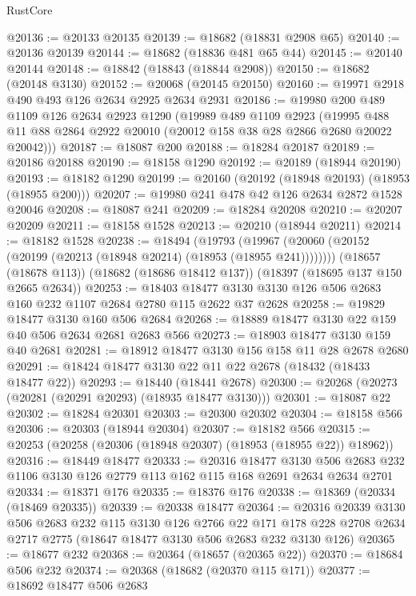 \begin{lexlean}{RustCore}
\begin{coremodule}
@20136 := @20133 @20135
@20139 := @18682 (@18831 @2908 @65)
@20140 := @20136 @20139
@20144 := @18682 (@18836 @481 @65 @44)
@20145 := @20140 @20144
@20148 := @18842 (@18843 (@18844 @2908))
@20150 := @18682 (@20148 @3130)
@20152 := @20068 (@20145 @20150)
@20160 := @19971 @2918 @490 @493 @126 @2634 @2925 @2634 @2931
@20186 := @19980
    @200
    @489
    @1109
    @126
    @2634
    @2923
    @1290
    (@19989
      @489
      @1109
      @2923
      (@19995 @488 @11 @88 @2864 @2922 @20010 (@20012 @158 @38 @28 @2866 @2680 @20022 @20042)))
@20187 := @18087 @200
@20188 := @18284 @20187
@20189 := @20186 @20188
@20190 := @18158 @1290
@20192 := @20189 (@18944 @20190)
@20193 := @18182 @1290
@20199 := @20160 (@20192 (@18948 @20193) (@18953 (@18955 @200)))
@20207 := @19980 @241 @478 @42 @126 @2634 @2872 @1528 @20046
@20208 := @18087 @241
@20209 := @18284 @20208
@20210 := @20207 @20209
@20211 := @18158 @1528
@20213 := @20210 (@18944 @20211)
@20214 := @18182 @1528
@20238 := @18494
    (@19793 (@19967 (@20060 (@20152 (@20199 (@20213 (@18948 @20214) (@18953 (@18955 @241))))))))
    (@18657 (@18678 @113))
    (@18682 (@18686 @18412 @137))
    (@18397 (@18695 @137 @150 @2665 @2634))
@20253 := @18403 @18477 @3130 @3130 @126 @506 @2683 @160 @232 @1107 @2684 @2780 @115 @2622 @37 @2628
@20258 := @19829 @18477 @3130 @160 @506 @2684
@20268 := @18889 @18477 @3130 @22 @159 @40 @506 @2634 @2681 @2683 @566
@20273 := @18903 @18477 @3130 @159 @40 @2681
@20281 := @18912 @18477 @3130 @156 @158 @11 @28 @2678 @2680
@20291 := @18424 @18477 @3130 @22 @11 @22 @2678 (@18432 (@18433 @18477 @22))
@20293 := @18440 (@18441 @2678)
@20300 := @20268 (@20273 (@20281 (@20291 @20293) (@18935 @18477 @3130)))
@20301 := @18087 @22
@20302 := @18284 @20301
@20303 := @20300 @20302
@20304 := @18158 @566
@20306 := @20303 (@18944 @20304)
@20307 := @18182 @566
@20315 := @20253 (@20258 (@20306 (@18948 @20307) (@18953 (@18955 @22)) @18962))
@20316 := @18449 @18477
@20333 := @20316
    @18477
    @3130
    @506
    @2683
    @232
    @1106
    @3130
    @126
    @2779
    @113
    @162
    @115
    @168
    @2691
    @2634
    @2634
    @2701
@20334 := @18371 @176
@20335 := @18376 @176
@20338 := @18369 (@20334 (@18469 @20335))
@20339 := @20338 @18477
@20364 := @20316
    @20339
    @3130
    @506
    @2683
    @232
    @115
    @3130
    @126
    @2766
    @22
    @171
    @178
    @228
    @2708
    @2634
    @2717
    @2775
    (@18647 @18477 @3130 @506 @2683 @232 @3130 @126)
@20365 := @18677 @232
@20368 := @20364 (@18657 (@20365 @22))
@20370 := @18684 @506 @232
@20374 := @20368 (@18682 (@20370 @115 @171))
@20377 := @18692 @18477 @506 @2683

\end{coremodule}
\end{lexlean}
